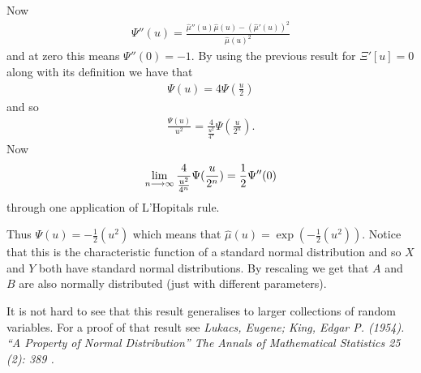 \documentclass{unswmaths}
\begin{document}
Now 
\begin{align}
 \Psi''(u) = \frac{\hat{\mu}''(u) \hat{\mu}(u) - (\hat{\mu}'{(u)})^2}{\hat{\mu}(u)^2}
 \end{align}
 and at zero this means $ \Psi''(0) = -1 $.
 By using the previous result for $ \Xi'[u] = 0 $ along with its definition we have that
 \begin{align}
 	\Psi(u) = 4\Psi(\frac{u}{2})
 \end{align}
 and so 
 \begin{align}
 	\frac{\Psi(u)}{u^2} = \frac{4}{\frac{u^2}{4^n}}\Psi(\frac{u}{2^n}).
 \end{align}
 Now
 \begin{align}
 	\lim_{n\longrightarrow\infty}\frac{4}{\frac{u^2}{4^n}}\Psi(\frac{u}{2^n}) = \frac{1}{2} \Psi''(0)
 \end{align}
 through one application of L'Hopitals rule.
 
 Thus $ \Psi(u) = -\frac{1}{2}(u^2) $
 which means that $ \hat{\mu}(u) = \exp(-\frac{1}{2}(u^2)) $.
 Notice that this is the characteristic function of a standard normal distribution and so $ X $ and $ Y $ both have standard normal distributions. By rescaling we get that $ A $ and $ B $ are also normally distributed (just with different parameters).
 
 It is not hard to see that this result generalises to larger collections of random variables. For a proof of that result see \emph{Lukacs, Eugene; King, Edgar P. (1954). ``A Property of Normal Distribution'' The Annals of Mathematical Statistics 25 (2): 389 .}
\end{document}
